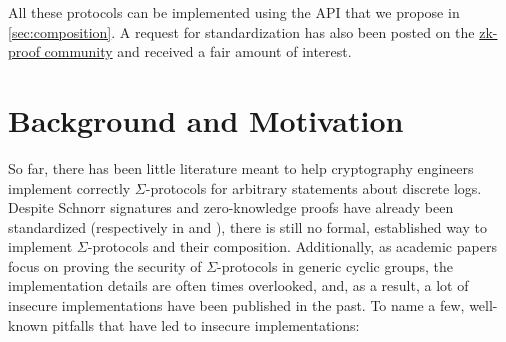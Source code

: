 \documentclass[runningheads]{llncs}
\begin{document}
All these protocols can be implemented using the API that we propose in \cref{sec:composition}.
A request for standardization has also been posted on the \href{https://community.zkproof.org/t/standardizing-sigma-protocols/471/}{zk-proof community} and received a fair amount of interest.


\section{Background and Motivation}
\label{sec:motivation}
So far, there has been little literature meant to help cryptography engineers implement correctly $\Sigma$-protocols for arbitrary statements about discrete logs.
Despite Schnorr signatures and zero-knowledge proofs have already been standardized (respectively in \cite{rfc8032} and \cite{rfc8235}), there is still no formal, established way to implement  $\Sigma$-protocols and their composition.
 Additionally, as academic papers focus on proving the security of  $\Sigma$-protocols in generic cyclic groups, the implementation details are often times overlooked, and, as a result, a lot of insecure implementations have been published in the past. To name a few, well-known pitfalls that have led to insecure implementations:
\end{document}
